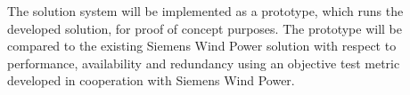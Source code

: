 The solution system will be implemented as a prototype, which runs the developed solution, for proof of concept purposes. The prototype will be compared to the existing Siemens Wind Power solution with respect to performance, availability and redundancy using an objective test metric developed in cooperation with Siemens Wind Power.




%
%



